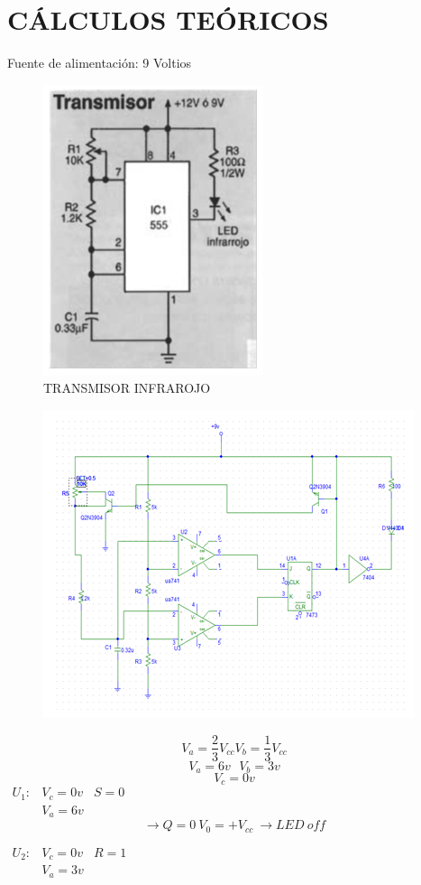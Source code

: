 \documentclass[a4paper,11pt]{article}
\begin{document}
\section{CÁLCULOS TEÓRICOS}
Fuente de alimentación: 9 Voltios

	\begin{figure}[h]
		\caption{TRANSMISOR INFRAROJO}
		\centering
		\includegraphics[width=0.4\linewidth]{./19}
	\end{figure}
	
	\begin{figure}[h]
		\centering
		\includegraphics[width=0.7\linewidth]{./20}
	\end{figure}	
\newpage
$$V_a = \frac{2}{3}V_{cc}V_b = \frac{1}{3}V_{cc}$$
$$V_a = 6v \ \ \ V_b = 3v$$
$$V_c = 0v$$
$\begin{array}{lcl}
U_1: & V_c = 0v & S=0 \\
	& V_a = 6v &
\end{array}$
$$\rightarrow Q = 0 \ V_0= +V_{cc} \ \rightarrow LED \ off$$

$\begin{array}{lcl}
U_2: & V_c = 0v & R = 1\\
	& V_a = 3v &
\end{array}$
\end{document}
